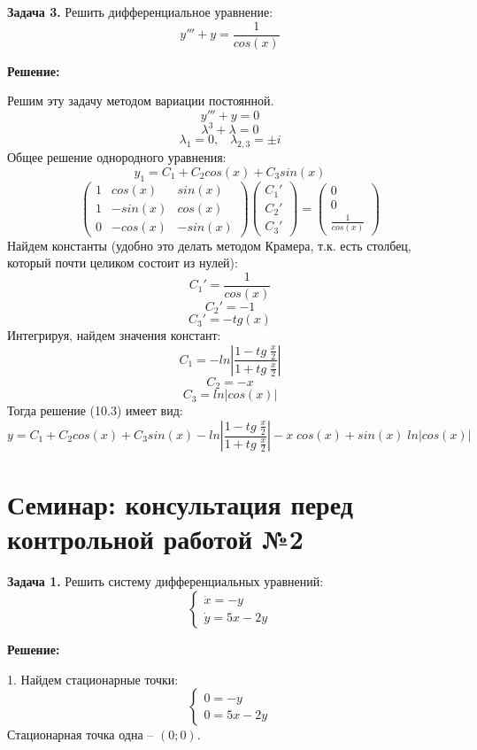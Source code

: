 \documentclass[10pt]{report}
\begin{document}
\textbf{Задача 3.} Решить дифференциальное уравнение: 
\begin{equation}
y'''+y=\frac {1} {cos(x)}
\end{equation}

\textbf{Решение:} \par
Решим эту задачу методом вариации постоянной.
\[y'''+y=0\]
\[\lambda^3+\lambda=0\]
\[\lambda_1=0, \;\;\; \lambda_{2,3}=\pm i\]
Общее решение однородного уравнения:
\[y_1=C_1+C_2cos(x)+C_3sin(x)\]
\[ \left(
\begin{array}{ccc}
1 & cos(x) & sin(x)\\
1 & -sin(x) & cos(x)\\
0 & -cos(x) & -sin(x)
\end{array}
\right)
 \left(
\begin{array}{c}
C_1'\\
C_2'\\
C_3'
\end{array}
\right)=
 \left(
\begin{array}{c}
0 \\
0 \\
\frac {1} {cos(x)}
\end{array}
\right)\]
Найдем константы (удобно это делать методом Крамера, т.к. есть столбец, который почти целиком состоит из нулей):
\[C_1'= \frac {1} {cos(x)}\]
\[C_2'=-1\]
\[C_3'=-tg(x)\]
Интегрируя, найдем значения констант:
\[C_1=-ln\left| \frac {1-tg\;  \frac x 2} {1+tg\;  \frac x 2} \right|\]
\[C_2=-x\]
\[C_3=ln|cos(x)|\]
Тогда решение (10.3) имеет вид:
\[y=C_1+C_2cos(x)+C_3sin(x)-ln\left| \frac {1-tg\;  \frac x 2} {1+tg\;  \frac x 2} \right|-x\;cos(x)+sin(x)\;ln|cos(x)|\]

\chapter[{Семинар: консультация перед контрольной работой №2}]{Семинар: консультация перед контрольной работой №2}
\thispagestyle{empty}

\textbf{Задача 1.} Решить систему дифференциальных уравнений: 
\begin{equation}
\left\{
\begin{array}{lr}
\dot{x}=-y\\
\dot{y}=5x-2y
\end{array}
\right.
\end{equation}

\textbf{Решение:} 

1. Найдем стационарные точки:\[
\left\{
\begin{array}{lr}
0=-y\\
0=5x-2y
\end{array}
\right.\]
Стационарная точка одна -- $(0; 0)$.
\end{document}
